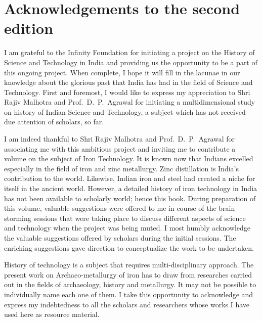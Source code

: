 \chapter*{Acknowledgements to the second edition}\label{acknowledgement}


\vspace{-.8cm}

I am grateful to the Infinity Foundation for initiating a project on the History of Science and Technology in India and providing us the opportunity to be a part of this ongoing project. When complete, I hope it will fill in the lacunae in our knowledge about the glorious past that India has had in the field of Science and Technology. First and foremost,  I would like to express my appreciation to Shri Rajiv Malhotra and Prof.~D.~P.~Agrawal for initiating a multidimensional study on history of Indian Science and Technology, a subject which has not received due attention of scholars, so far. 

I am indeed thankful to Shri Rajiv Malhotra and Prof.~D.~P.~Agrawal for associating me with this ambitious project and inviting me to contribute a volume on the subject of Iron Technology. It is known now that Indians excelled especially in the field of iron and zinc metallurgy. Zinc distillation is India’s contribution to the world. Likewise, Indian iron and steel had created a niche for itself in the ancient world.  However, a detailed history of iron technology in India has not been available to scholarly world; hence this book. During preparation of this volume, valuable suggestions were offered to me in course of the brain storming sessions that were taking place to discuss different aspects of science and technology when the project was being muted. I most humbly acknowledge the valuable suggestions offered by scholars during the initial sessions. The enriching suggestions gave direction to conceptualize the work to be undertaken. 

History of technology is a subject that requires multi-disciplinary approach. The present work on Archaeo-metallurgy of iron has to draw from researches carried out in the fields of archaeology, history and metallurgy. It may not be possible to individually name each one of them. I take this opportunity to acknowledge and express my indebtedness to all the scholars and researchers whose works I have used here as resource material. 

